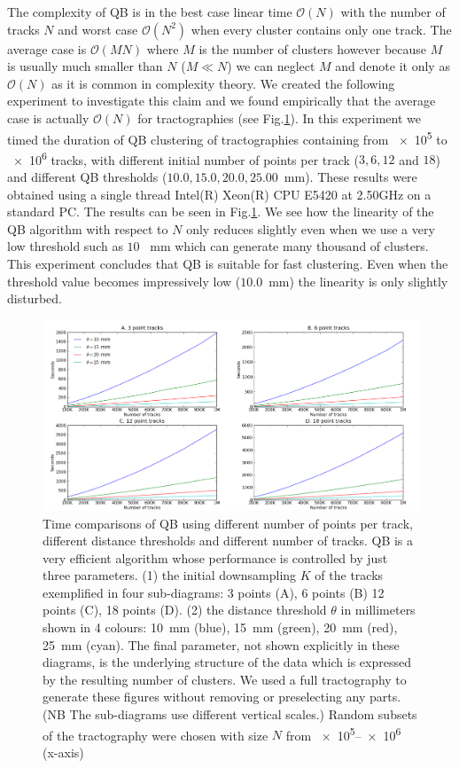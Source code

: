 \documentclass[journal]{IEEEtran}
\begin{document}
The complexity of QB is in the best case linear time $\mathcal{O}(N)$
with the number of tracks $N$ and worst case $\mathcal{O}(N^{2})$ when
every cluster contains only one track. The average case is
$\mathcal{O}(MN)$ where $M$ is the number of clusters however because
$M$ is usually much smaller than $N$ ($M\ll N$) we can neglect $M$ and
denote it only as $\mathcal{O}(N)$ as it is common in complexity
theory. We created the following experiment to investigate this claim
and we found empirically that the average case is actually
$\mathcal{O}(N)$ for tractographies (see Fig.\ref{Flo:Speed1}).  In this
experiment we timed the duration of QB clustering of tractographies
containing from \num{e5} to \num{e6} tracks, with different initial
number of points per track ($3,6,12$ and $18$) and different QB
thresholds ($10.0,15.0,20.0,25.00$~mm). These results were obtained using
a single thread Intel(R) Xeon(R) CPU E5420 at 2.50GHz on a standard
PC. The results can be seen in Fig.\ref{Flo:Speed1}. We see how the
linearity of the QB algorithm with respect to $N$ only reduces slightly
even when we use a very low threshold such as $10$ ~mm which can
generate many thousand of clusters. This experiment concludes that QB is
suitable for fast clustering. Even when the threshold value becomes
impressively low ($10.0$~mm) the linearity is only slightly disturbed.

\begin{figure}
\noindent \begin{centering}
\includegraphics[scale=0.23]{Fig_3_2x2+leg-box}
\par\end{centering}
\caption{Time comparisons of QB using different number of points per
  track, different distance thresholds and different number of
  tracks. QB is a very efficient algorithm whose performance is
  controlled by just three parameters. (1) the initial downsampling $K$
  of the tracks exemplified in four sub-diagrams: 3 points (A), 6 points
  (B) 12 points (C), 18 points (D). (2) the distance threshold $\theta$
  in millimeters shown in 4 colours: 10~mm (blue), 15~mm (green), 20~mm
  (red), 25~mm (cyan). The final parameter, not shown explicitly in
  these diagrams, is the underlying structure of the data which is
  expressed by the resulting number of clusters.  We used a full
  tractography to generate these figures without removing or
  preselecting any parts. (NB The sub-diagrams use
  different vertical scales.) Random subsets of the tractography were
  chosen with size $N$ from \numrange{e5}{e6} (x-axis)\label{Flo:Speed1}}
\end{figure}
\end{document}
